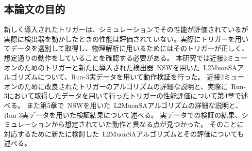 \subsection{本論文の目的}\label{chapter3-4}
新しく導入されたトリガーは、シミュレーションでその性能が評価されているが実際に検出器を動かしたときの性能は評価されていない。実際にトリガーを用いてデータを選別して取得し、物理解析に用いるためにはそのトリガーが正しく、想定通りの動作をしていることを確認する必要がある。
本研究では近接2ミューオンのためのトリガーと新たに導入された検出器~NSWを用いた~L2MuonSAアルゴリズムについて、Run-3実データを用いて動作検証を行った。
近接2ミューオンのために改良されたトリガーのアルゴリズムの詳細な説明と、実際に~Run-3において取得したデータを用いて行ったトリガーの性能評価について第4章で述べる。
また第5章で~NSWを用いた~L2MuonSAアルゴリズムの詳細な説明と、Run-3実データを用いた検証結果について述べる。
実データでの検証の結果、シミュレーションから想定されていた動作と異なる点が見つかった。
そのことに対応するために新たに検討した~L2MuonSAアルゴリズムとその評価についても述べる。
